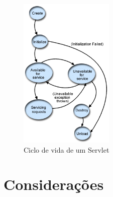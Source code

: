 \begin{figure}[!htb]
	\centering
	\includegraphics[width=0.4\textwidth]{./imgs/servletciclo.png}
	\caption[Ciclo de vida de um Servlet]{Ciclo de vida de um Servlet}
	\label{fig:servletciclo}
\end{figure}

\section{Considerações}
